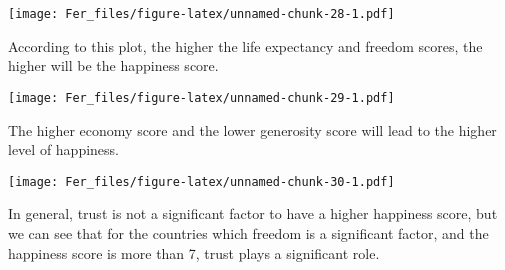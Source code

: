 \documentclass[
]{article}
\newenvironment{Shaded}{\begin{snugshade}}{\end{snugshade}}
\newcommand{\AttributeTok}[1]{\textcolor[rgb]{0.13,0.29,0.53}{#1}}
\newcommand{\DecValTok}[1]{\textcolor[rgb]{0.00,0.00,0.81}{#1}}
\newcommand{\FunctionTok}[1]{\textcolor[rgb]{0.13,0.29,0.53}{\textbf{#1}}}
\newcommand{\NormalTok}[1]{#1}
\newcommand{\SpecialCharTok}[1]{\textcolor[rgb]{0.81,0.36,0.00}{\textbf{#1}}}
\newcommand{\StringTok}[1]{\textcolor[rgb]{0.31,0.60,0.02}{#1}}
\begin{document}
\texttt{[image: Fer\_files/figure-latex/unnamed-chunk-28-1.pdf]}

According to this plot, the higher the life expectancy and freedom
scores, the higher will be the happiness score.

\begin{Shaded}
\end{Shaded}

\texttt{[image: Fer\_files/figure-latex/unnamed-chunk-29-1.pdf]}

The higher economy score and the lower generosity score will lead to the
higher level of happiness.

\begin{Shaded}
\end{Shaded}

\texttt{[image: Fer\_files/figure-latex/unnamed-chunk-30-1.pdf]}

In general, trust is not a significant factor to have a higher happiness
score, but we can see that for the countries which freedom is a
significant factor, and the happiness score is more than 7, trust plays
a significant role.
\end{document}
